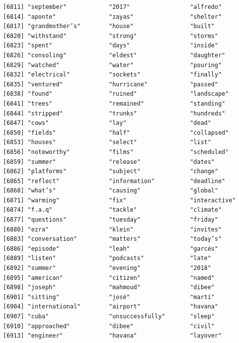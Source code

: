 \documentclass[
  letterpaper,
  DIV=11,
  numbers=noendperiod]{scrartcl}
\begin{document}
\begin{verbatim}
[6811] "september"            "2017"                 "alfredo"             
[6814] "aponte"               "zayas"                "shelter"             
[6817] "grandmother’s"        "house"                "built"               
[6820] "withstand"            "strong"               "storms"              
[6823] "spent"                "days"                 "inside"              
[6826] "consoling"            "eldest"               "daughter"            
[6829] "watched"              "water"                "pouring"             
[6832] "electrical"           "sockets"              "finally"             
[6835] "ventured"             "hurricane"            "passed"              
[6838] "found"                "ruined"               "landscape"           
[6841] "trees"                "remained"             "standing"            
[6844] "stripped"             "trunks"               "hundreds"            
[6847] "cows"                 "lay"                  "dead"                
[6850] "fields"               "half"                 "collapsed"           
[6853] "houses"               "select"               "list"                
[6856] "noteworthy"           "films"                "scheduled"           
[6859] "summer"               "release"              "dates"               
[6862] "platforms"            "subject"              "change"              
[6865] "reflect"              "information"          "deadline"            
[6868] "what’s"               "causing"              "global"              
[6871] "warming"              "fix"                  "interactive"         
[6874] "f.a.q"                "tackle"               "climate"             
[6877] "questions"            "tuesday"              "friday"              
[6880] "ezra"                 "klein"                "invites"             
[6883] "conversation"         "matters"              "today’s"             
[6886] "episode"              "leah"                 "garcés"              
[6889] "listen"               "podcasts"             "late"                
[6892] "summer"               "evening"              "2018"                
[6895] "american"             "citizen"              "named"               
[6898] "joseph"               "mahmoud"              "dibee"               
[6901] "sitting"              "josé"                 "martí"               
[6904] "international"        "airport"              "havana"              
[6907] "cuba"                 "unsuccessfully"       "sleep"               
[6910] "approached"           "dibee"                "civil"               
[6913] "engineer"             "havana"               "layover"             

\end{verbatim}
\end{document}
